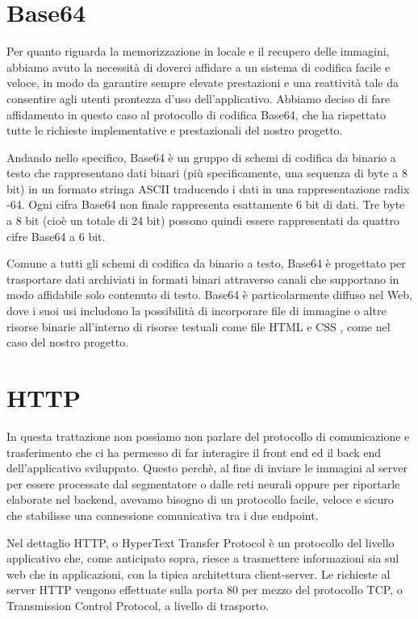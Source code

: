 \section{Base64}

Per quanto riguarda la memorizzazione in locale e il recupero delle immagini, abbiamo avuto la necessità di doverci affidare a un sistema di codifica facile e veloce, in modo da garantire sempre elevate prestazioni e una reattività tale da consentire agli utenti prontezza d'uso dell'applicativo. Abbiamo deciso di fare affidamento in questo caso al protocollo di codifica Base64, che ha rispettato tutte le richieste implementative e prestazionali del nostro progetto.

Andando nello specifico, Base64 è un gruppo di schemi di codifica da binario a testo che rappresentano dati binari (più specificamente, una sequenza di byte a 8 bit) in un formato stringa ASCII traducendo i dati in una rappresentazione radix -64. Ogni cifra Base64 non finale rappresenta esattamente 6 bit di dati. Tre byte a 8 bit (cioè un totale di 24 bit) possono quindi essere rappresentati da quattro cifre Base64 a 6 bit.

Comune a tutti gli schemi di codifica da binario a testo, Base64 è progettato per trasportare dati archiviati in formati binari attraverso canali che supportano in modo affidabile solo contenuto di testo. Base64 è particolarmente diffuso nel Web, dove i suoi usi includono la possibilità di incorporare file di immagine o altre risorse binarie all'interno di risorse testuali come file HTML e CSS , come nel caso del nostro progetto.

\section{HTTP}

In questa trattazione non possiamo non parlare del protocollo di comunicazione e trasferimento che ci ha permesso di far interagire il front end ed il back end dell'applicativo sviluppato. Questo perchè, al fine di inviare le immagini al server per essere processate dal segmentatore o dalle reti neurali oppure per riportarle elaborate nel backend, avevamo bisogno di un protocollo facile, veloce e sicuro che stabilisse una connessione comunicativa tra i due endpoint.

Nel dettaglio HTTP, o HyperText Transfer Protocol è un protocollo del livello applicativo che, come anticipato sopra, riesce a trasmettere informazioni sia sul web che in applicazioni, con la tipica architettura client-server. Le richieste al server HTTP vengono effettuate sulla porta 80 per mezzo del protocollo TCP, o Transmission Control Protocol, a livello di trasporto.

